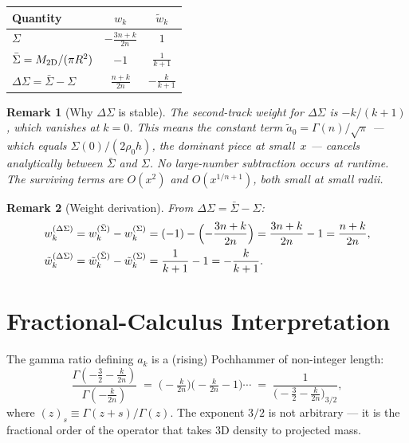 \documentclass{article}
\newtheorem{remark}{Remark}
\begin{document}
\begin{center}
\renewcommand{\arraystretch}{1.4}
\begin{tabular}{lcc}
\toprule
Quantity & $w_k$ & $\tilde w_k$\\
\midrule
$\Sigma$
  & $\displaystyle -\frac{3n+k}{2n}$
  & $1$\\[8pt]
$\bar\Sigma = M_{\rm 2D}/(\pi R^2)$
  & $-1$
  & $\displaystyle\frac{1}{k+1}$\\[8pt]
$\Delta\Sigma = \bar\Sigma - \Sigma$
  & $\displaystyle\frac{n+k}{2n}$
  & $\displaystyle -\frac{k}{k+1}$\\[4pt]
\bottomrule
\end{tabular}
\end{center}

\begin{remark}[Why $\Delta\Sigma$ is stable]
The second-track weight for $\Delta\Sigma$ is $-k/(k+1)$, which vanishes at
$k=0$.  This means the constant term $\tilde a_0=\Gamma(n)/\sqrt\pi$ ---
which equals $\Sigma(0)/(2\rho_0 h)$, the dominant piece at small~$x$ ---
cancels \emph{analytically} between $\bar\Sigma$ and $\Sigma$. No large-number
subtraction occurs at runtime. The surviving terms are $O(x^{2})$ and
$O(x^{1/n+1})$, both small at small radii.
\end{remark}

\begin{remark}[Weight derivation]
From $\Delta\Sigma = \bar\Sigma - \Sigma$:
\begin{align*}
w_k^{(\Delta\Sigma)} &= w_k^{(\bar\Sigma)} - w_k^{(\Sigma)}
  = (-1) - \Bigl(-\frac{3n+k}{2n}\Bigr) = \frac{3n+k}{2n}-1 = \frac{n+k}{2n},\\
\tilde w_k^{(\Delta\Sigma)} &= \tilde w_k^{(\bar\Sigma)} - \tilde w_k^{(\Sigma)}
  = \frac{1}{k+1} - 1 = -\frac{k}{k+1}.
\end{align*}
\end{remark}

\section{Fractional-Calculus Interpretation}
\label{sec:frac}

The gamma ratio defining $a_k$ is a (rising) Pochhammer of non-integer length:
\begin{equation}\label{eq:pochhammer}
\frac{\Gamma(-\tfrac{3}{2}-\tfrac{k}{2n})}{\Gamma(-\tfrac{k}{2n})}
\;=\;
\bigl(-\tfrac{k}{2n}\bigr)\bigl(-\tfrac{k}{2n}-1\bigr)\cdots
\;=\;\frac{1}{\bigl(-\tfrac{3}{2}-\tfrac{k}{2n}\bigr)_{3/2}},
\end{equation}
where $(z)_{s}\equiv\Gamma(z+s)/\Gamma(z)$. The exponent $3/2$ is not arbitrary
--- it is the fractional order of the operator that takes 3D density to
projected mass.
\end{document}
